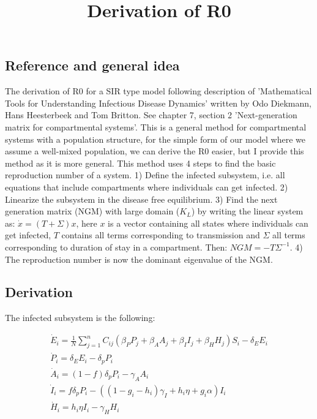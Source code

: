 \documentclass{article}
\title{Derivation of R0}
\begin{document}
\maketitle

\subsection*{Reference and general idea}

The derivation of R0 for a SIR type model following description of 'Mathematical Tools for Understanding Infectious Disease Dynamics' written by Odo Diekmann, Hans Heesterbeek and Tom Britton. 
See chapter 7, section 2 'Next-generation matrix for compartmental systems'. 
This is a general method for compartmental systems with a population structure, for the simple form of our model where we assume a well-mixed population, we can derive the R0 easier, but I provide this method as it is more general. 
This method uses 4 steps to find the basic reproduction number of a system.
1) Define the infected subsystem, i.e. all equations that include compartments where individuals can get infected. 
2) Linearize the subsystem in the disease free equilibrium. 
3) Find the next generation matrix (NGM) with large domain ($K_L$) by writing the linear system as: $\dot{x} = (T + \Sigma) x$, here $x$ is a vector containing all states where individuals can get infected, $T$ contains all terms corresponding to transmission and $\Sigma$ all terms corresponding to duration of stay in a compartment. Then: $NGM = -T \Sigma^{-1}. $
4) The reproduction number is now the dominant eigenvalue of the NGM. 

\subsection*{Derivation}

The infected subsystem is the following: 

\begin{gather*}
    \dot{E}_i = \frac{1}{N} \sum_{j = 1}^n C_{ij}(\beta_P P_j + \beta_A A_j + \beta_I I_j + \beta_H H_j) S_i - \delta_E E_i \\
    \dot{P}_i = \delta_E E_i - \delta_p P_i \\
    \dot{A}_i = (1-f) \delta_p P_i - \gamma_A A_i \\
    \dot{I}_i = f \delta_p P_i - ((1-g_i-h_i) \gamma_{I} + h_i \eta + g_i \alpha) I_i \\   
    \dot{H}_i = h_i \eta I_i - \gamma_H H_i   
\end{gather*}
\end{document}
